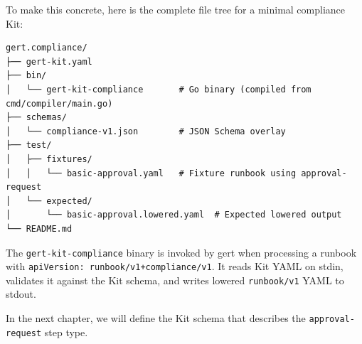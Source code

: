 To make this concrete, here is the complete file tree for a minimal compliance
Kit:

\begin{verbatim}
gert.compliance/
├── gert-kit.yaml
├── bin/
│   └── gert-kit-compliance       # Go binary (compiled from cmd/compiler/main.go)
├── schemas/
│   └── compliance-v1.json        # JSON Schema overlay
├── test/
│   ├── fixtures/
│   │   └── basic-approval.yaml   # Fixture runbook using approval-request
│   └── expected/
│       └── basic-approval.lowered.yaml  # Expected lowered output
└── README.md
\end{verbatim}

The \texttt{gert-kit-compliance} binary is invoked by gert when processing a
runbook with \texttt{apiVersion: runbook/v1+compliance/v1}. It reads Kit YAML
on stdin, validates it against the Kit schema, and writes lowered
\texttt{runbook/v1} YAML to stdout.

In the next chapter, we will define the Kit schema that describes the
\texttt{approval-request} step type.
